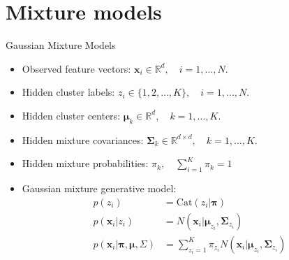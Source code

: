 \documentclass[10pt,mathserif]{beamer}
\begin{document}
\section{Mixture models}
\begin{frame}{Gaussian Mixture Models}
\begin{itemize}
    \item Observed feature vectors: $\bm{x}_i\in\mathbb{R}^d, \quad i=1,\ldots,N$.
    \item Hidden cluster labels: $z_i\in\{1,2,\ldots,K\}, \quad i=1,\ldots,N$.
    \item Hidden cluster centers: $\bm{\mu}_k\in\mathbb{R}^d, \quad k=1,\ldots,K$. 
    \item Hidden mixture covariances: $\bm{\Sigma}_k\in\mathbb{R}^{d \times d}, \quad k=1,\ldots,K$.
    \item Hidden mixture probabilities: $\pi_k, \quad \sum_{i=1}^K \pi_k = 1$
    \item Gaussian mixture generative model: 
    \begin{equation*}
        \begin{split}
            p(z_i) & = \text{Cat}(z_i|\bm{\pi}) \\
            p(\bm{x}_i | z_i) & = N(\bm{x}_i | \bm{\mu}_{z_i}, \bm{\Sigma}_{z_i} )\\
            p(\bm{x}_i|\bm{\pi},\bm{\mu},\Sigma) & = \sum_{z_i=1}^K \pi_{z_i} N(\bm{x}_i | \bm{\mu}_{z_i}, \bm{\Sigma}_{z_i})
        \end{split}
    \end{equation*}
\end{itemize}
\end{frame}
\end{document}
